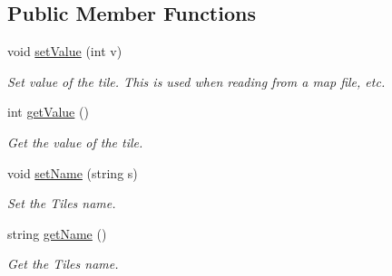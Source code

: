 \subsection*{Public Member Functions}
\begin{DoxyCompactItemize}
\item 
void \hyperlink{classTile_ae3d9e4ace265389dd0e0cf3d62ad6ff3}{set\+Value} (int v)\hypertarget{classTile_ae3d9e4ace265389dd0e0cf3d62ad6ff3}{}\label{classTile_ae3d9e4ace265389dd0e0cf3d62ad6ff3}

\begin{DoxyCompactList}\small\item\em Set value of the tile. This is used when reading from a map file, etc. \end{DoxyCompactList}\item 
int \hyperlink{classTile_aaab3d77d23e378c207ec50e6786052e0}{get\+Value} ()\hypertarget{classTile_aaab3d77d23e378c207ec50e6786052e0}{}\label{classTile_aaab3d77d23e378c207ec50e6786052e0}

\begin{DoxyCompactList}\small\item\em Get the value of the tile. \end{DoxyCompactList}\item 
void \hyperlink{classTile_a03e1a9f0351fcd4d1616bb59f7bd89f3}{set\+Name} (string s)\hypertarget{classTile_a03e1a9f0351fcd4d1616bb59f7bd89f3}{}\label{classTile_a03e1a9f0351fcd4d1616bb59f7bd89f3}

\begin{DoxyCompactList}\small\item\em Set the Tiles name. \end{DoxyCompactList}\item 
string \hyperlink{classTile_a233978090bf0ecbec9aa4d00bb0ac13d}{get\+Name} ()\hypertarget{classTile_a233978090bf0ecbec9aa4d00bb0ac13d}{}\label{classTile_a233978090bf0ecbec9aa4d00bb0ac13d}

\begin{DoxyCompactList}\small\item\em Get the Tiles name. \end{DoxyCompactList}\end{DoxyCompactItemize}
